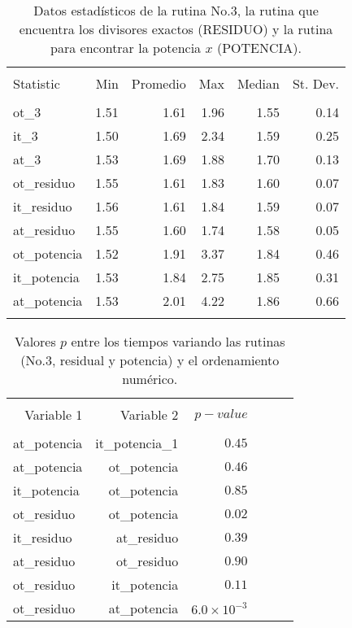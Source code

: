 \documentclass{article}
\begin{document}
\begin{table}[!htbp] \centering 
  \caption{Datos estadísticos de la rutina No.3, la rutina que encuentra los divisores exactos (RESIDUO) y la rutina para encontrar la potencia $x$ (POTENCIA).} 
  \label{estadistica3} 
\begin{tabular}{@{\extracolsep{5pt}}lrrrrr} 
\\[-1.8ex]\hline 
\hline \\[-1.8ex] 
Statistic & \multicolumn{1}{r}{Min} & \multicolumn{1}{r}{Promedio} & \multicolumn{1}{r}{Max} & \multicolumn{1}{r}{Median} & \multicolumn{1}{r}{St. Dev.} \\ 
\hline \\[-1.8ex] 
ot\_3 & 1.51 & 1.61 & 1.96 & 1.55 & 0.14 \\ 
it\_3 & 1.50 & 1.69 & 2.34 & 1.59 & 0.25 \\ 
at\_3 & 1.53 & 1.69 & 1.88 & 1.70 & 0.13 \\ 
ot\_residuo & 1.55 & 1.61 & 1.83 & 1.60 & 0.07 \\ 
it\_residuo & 1.56 & 1.61 & 1.84 & 1.59 & 0.07 \\ 
at\_residuo & 1.55 & 1.60 & 1.74 & 1.58 & 0.05 \\ 
ot\_potencia & 1.52 & 1.91 & 3.37 & 1.84 & 0.46 \\ 
it\_potencia & 1.53 & 1.84 & 2.75 & 1.85 & 0.31 \\ 
at\_potencia & 1.53 & 2.01 & 4.22 & 1.86 & 0.66 \\ 

\hline \\[-1.8ex] 
\end{tabular} 
\end{table} 

\begin{table}[!htbp] \centering 
  \caption{Valores $p$ entre los tiempos variando las rutinas (No.3, residual y potencia) y el ordenamiento numérico.} 
  \label{estadistica4} 
\begin{tabular}{@{\extracolsep{5pt}}lrrrrr} 
\\[-1.8ex]\hline 
\hline \\[-1.8ex] 
 \multicolumn{1}{r}{Variable 1} & \multicolumn{1}{r}{Variable 2} & \multicolumn{1}{r}{$p-value$}  \\ 
\hline \\[-1.8ex] 
at\_potencia & it\_potencia\_1& $0.45$ \\ 
at\_potencia & ot\_potencia& $0.46$ \\ 
it\_potencia & ot\_potencia& $0.85$ \\
ot\_residuo& ot\_potencia& $0.02$ \\
it\_residuo & at\_residuo& $0.39$ \\
at\_residuo & ot\_residuo& $0.90$ \\
ot\_residuo& it\_potencia& $0.11$ \\
ot\_residuo& at\_potencia& $6.0 \times 10^{-3}$ \\
\end{tabular} 
\end{table} 
\end{document}
